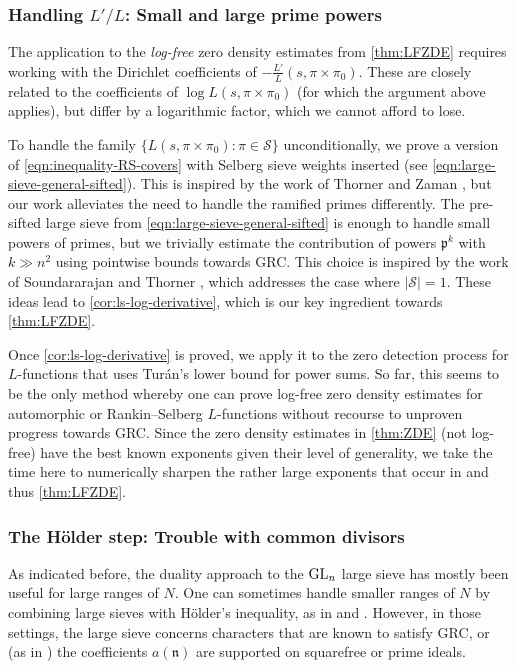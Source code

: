 \documentclass[11pt]{amsart}
\theoremstyle{remark}
\numberwithin{equation}{section}
\newcommand{\kp}{\mathfrak{p}}
\newcommand{\kn}{\mathfrak{n}}
\newcommand{\GL}{\textnormal{GL}}
\begin{document}
\subsubsection{Handling $L'/L$: Small and large prime powers}
The application to the \emph{log-free} zero density estimates from \cref{thm:LFZDE} requires working with the Dirichlet coefficients of $-\frac{L'}{L}(s, \pi \times \pi_0)$. These are closely related to the coefficients of $\log L(s, \pi \times \pi_0)$ (for which the argument above applies), but differ by a logarithmic factor, which we cannot afford to lose. 

To handle the family $\{L(s,\pi\times\pi_0)\colon\pi\in\mathcal{S}\}$ unconditionally, we prove a version of \eqref{eqn:inequality-RS-covers} with Selberg sieve weights inserted (see \eqref{eqn:large-sieve-general-sifted}).  This is inspired by the work of Thorner and Zaman \cite{TZ_GLn}, but our work alleviates the need to handle the ramified primes differently. The pre-sifted large sieve from \eqref{eqn:large-sieve-general-sifted} is enough to handle small powers of primes, but we trivially estimate the contribution of powers $\kp^k$ with $k\gg n^2$ using pointwise bounds towards GRC. This choice is inspired by the work of Soundararajan and Thorner \cite[Proof of Theorem 2.4]{soundararajan2019weak}, which addresses the case where $|\mathcal{S}|=1$. These ideas lead to \cref{cor:ls-log-derivative}, which is our key ingredient towards \cref{thm:LFZDE}.

Once \cref{cor:ls-log-derivative} is proved, we apply it to the zero detection process for $L$-functions that uses Tur{\'a}n's lower bound for power sums.  So far, this seems to be the only method whereby one can prove log-free zero density estimates for automorphic or Rankin--Selberg $L$-functions without recourse to unproven progress towards GRC. Since the zero density estimates in \cref{thm:ZDE} (not log-free) have the best known exponents given their level of generality, we take the time here to numerically sharpen the rather large exponents that occur in \cite{BrumleyThornerZaman,soundararajan2019weak,TZ_GLn} and thus \cref{thm:LFZDE}.


\subsubsection{The H\"older step: Trouble with common divisors} 
As indicated before, the duality approach to the $\GL_n$ large sieve has mostly been useful for large ranges of $N$. One can sometimes handle smaller ranges of $N$ by combining large sieves with H{\"o}lder's inequality, as in \cite[Section 21]{FI} and \cite[Section 5.2]{LOSmith}. However, in those settings, the large sieve concerns characters that are known to satisfy GRC, or (as in \cite{LOSmith}) the coefficients $a(\kn)$ are supported on squarefree or prime ideals.
\end{document}
